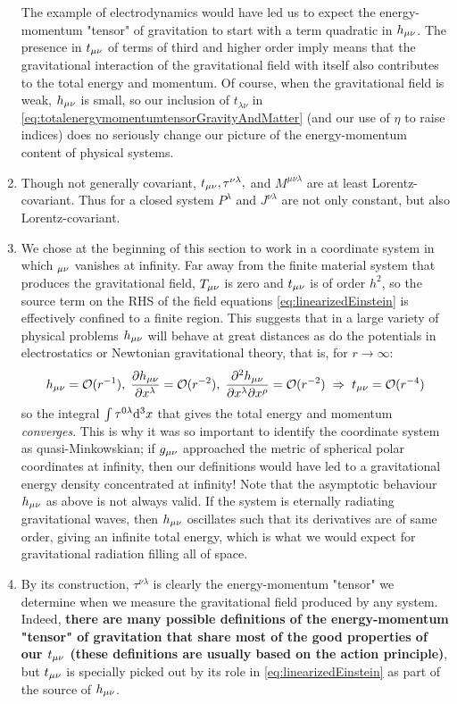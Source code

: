 \begin{enumerate}
	The example of electrodynamics would have led us to expect the energy-momentum "tensor" of gravitation to start with a term quadratic in $h_{\mu \nu}$.  The presence in $t_{\mu \nu}$ of terms of third and higher order imply means that the gravitational interaction of the gravitational field with itself also contributes to the total energy and momentum. Of course, when the gravitational field is weak, $h_{\mu \nu}$ is small, so our inclusion of $t_{\lambda \nu}$ in \ref{eq:totalenergymomentumtensorGravityAndMatter} (and our use of $\eta$ to raise indices) does no seriously change our picture of the energy-momentum content of physical systems.
	\item Though not generally covariant, $t_{\mu \nu}, \tau^{\nu \lambda},$ and $M^{\mu \nu \lambda}$ are at least Lorentz-covariant. Thus for a closed system $P^\lambda$ and $J^{\nu \lambda}$ are not only constant, but also Lorentz-covariant.
	\item We chose at the beginning of this section to work in a coordinate system in which $_{\mu \nu}$ vanishes at infinity. Far away from the finite material system that produces the gravitational field, $T_{\mu \nu}$ is zero and $t_{\mu \nu}$ is of order $h^2$, so the source term on the RHS of the field equations \ref{eq:linearizedEinstein} is effectively confined to a finite region. This suggests that in a large variety of physical problems $h_{\mu \nu}$ will behave at great distances as do the potentials in electrostatics or Newtonian gravitational theory, that is, for $r\rightarrow\infty$:
	\begin{equation}
		h_{\mu \nu}= \mathcal{O}(r^{-1}), \; \frac{\partial h_{\mu \nu}}{\partial x^\lambda} = \mathcal{O}(r^{-2}), \; \frac{\partial^2 h_{\mu \nu}}{\partial x^\lambda \partial x^\rho} = \mathcal{O}(r^{-2})\; \Rightarrow\; t_{\mu \nu} = \mathcal{O}(r^{-4})
	\end{equation}
	so the integral $\int \tau^{0 \lambda} \mathrm{d}^3 x$ that gives the total energy and momentum \emph{converges}. This is why it was so important to identify the coordinate system as quasi-Minkowskian; if $g_{\mu \nu}$ approached the metric of spherical polar coordinates at infinity, then our definitions would have led to a gravitational energy density concentrated at infinity! Note that the asymptotic behaviour $h_{\mu \nu}$ as above is not always valid. If the system is eternally radiating gravitational waves, then $h_{\mu \nu}$ oscillates such that its derivatives are of same order, giving an infinite total energy, which is what we would expect for gravitational radiation filling all of space.
	\item By its construction, $\tau^{\nu \lambda}$ is clearly the energy-momentum "tensor" we determine when we measure the gravitational field produced by any system. Indeed, \textbf{there are many possible definitions of the energy-momentum "tensor" of gravitation that share most of the good properties of our $t_{\mu \nu}$ (these definitions are usually based on the action principle)}, but $t_{\mu \nu}$ is specially picked out by its role in \ref{eq:linearizedEinstein} as part of the source of $h_{\mu \nu}$.

\end{enumerate}
